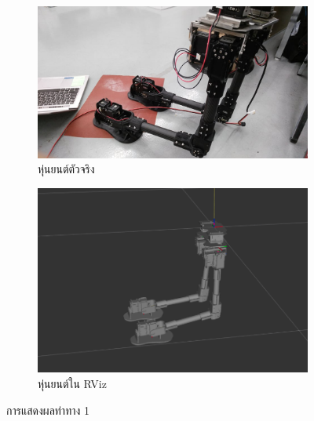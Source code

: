 \begin{figure}[!ht]
    \centering
    \begin{subfigure}[b]{0.45\textwidth}
        \centering
        \includegraphics[width=\textwidth]{chapter4/images/robot_2_rviz1.jpg}
        \caption{หุ่นยนต์ตัวจริง}
    \end{subfigure}
    \hfill
    \begin{subfigure}[b]{0.45\textwidth}
        \centering
        \includegraphics[width=\textwidth]{chapter4/images/robot_2_rviz1.png}
        \caption{หุ่นยนต์ใน RViz}
    \end{subfigure}
    \caption{การแสดงผลท่าทาง 1}
	\label{fig:robot_2_rviz1}
\end{figure}
